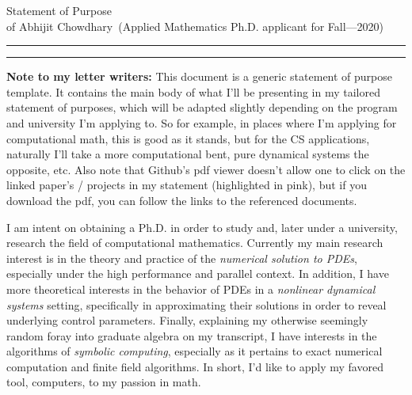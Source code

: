 \documentclass[11pt]{article}
\newcommand{\soptitle}{Statement of Purpose}
\newcommand{\yourname}{Abhijit Chowdhary}
\begin{document}
\begin{center}\LARGE\soptitle\\
\large of \yourname\ (Applied Mathematics Ph.D. applicant for Fall---2020)
\end{center}

\hrule
\vspace{1pt}
\hrule height 1pt

\bigskip

\textbf{Note to my letter writers:} This document is a generic statement of purpose
template. It contains the main body of what I'll be presenting in my tailored
statement of purposes, which will be adapted slightly depending on the program
and university I'm applying to. So for example, in places where I'm applying for
computational math, this is good as it stands, but for the CS applications,
naturally I'll take a more computational bent, pure dynamical systems the
opposite, etc. Also note that Github's pdf viewer doesn't allow one to click on
the linked paper's / projects in my statement (highlighted in pink), but if you
download the pdf, you can follow the links to the referenced documents.

\vspace{5pt}

I am intent on obtaining a Ph.D. in order to study and, later under
a university, research the field of computational mathematics. Currently my
main research interest is in the theory and practice of the {\em numerical
solution to PDEs}, especially under the high performance and parallel context.
In addition, I have more theoretical interests in the behavior of PDEs in a {\em
nonlinear dynamical systems} setting, specifically in approximating their
solutions in order to reveal underlying control parameters. Finally, explaining
my otherwise seemingly random foray into graduate algebra on my transcript,
I have interests in the algorithms of {\em symbolic computing}, especially as it
pertains to exact numerical computation and finite field algorithms. In short,
I'd like to apply my favored tool, computers, to my passion in math.
\end{document}
